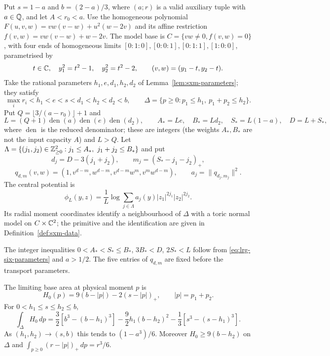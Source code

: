 \begin{definition}\label{def:lrg-six-model}
Put $s=1-a$ and $b=(2-a)/3$, where $(a;r)$ is a valid auxiliary tuple with $a\in\mathbb{Q}$, and let $A<r_0<a$.
Use the homogeneous polynomial $F(u,v,w)=vw(v-w)+u^2(w-2v)$ and its affine restriction
$f(v,w)=vw(v-w)+w-2v$. The model base is $C=\{vw\ne0,f(v,w)=0\}$, with four ends of homogeneous limits
$[0:1:0],[0:0:1],[0:1:1],[1:0:0]$, parametrised by
\[
 t\in\mathbb{C},\quad y_1^2=t^2-1,\quad y_2^2=t^2-2,
 \qquad (v,w)=(y_1-t,y_2-t).
\]
Take the rational parameters $h_1,e,d_1,h_2,d_2$ of Lemma~\ref{lem:sxm-parameters}; they satisfy
\begin{equation}\label{eq:lrg-six-parameters}
 \max_i r_i<h_1<e<s<d_1<h_2<d_2<b,
 \qquad \Delta=\{p\ge0:p_1\le h_1,\ p_1+p_2\le h_2\}.
\end{equation}
Put $Q=\lfloor3/(a-r_0)\rfloor+1$ and
\[
 L=(Q+1)\operatorname{den}(a)\operatorname{den}(e)\operatorname{den}(d_2),\qquad
 A_*=Le,\quad B_*=Ld_2,\quad S_*=L(1-a),\quad D=L+S_*,
\]
where $\operatorname{den}$ is the reduced denominator; these are integers (the weights $A_*,B_*$ are not the
input capacity $A$) and $L>Q$.
Let $\Lambda=\{(j_1,j_2)\in\mathbb{Z}_{\ge0}^2:j_1\le A_*,\ j_1+j_2\le B_*\}$ and put
\[
 d_j=D-3(j_1+j_2),\qquad m_j=(S_*-j_1-j_2)_+,
\]
\[
 q_{d,m}(v,w)=(1,v^{d-m},w^{d-m},v^{d-m}w^m,v^mw^{d-m}),
 \qquad a_j=\|q_{d_j,m_j}\|^2.
\]
The central potential is
\begin{equation}\label{eq:lrg-six-potential}
 \phi_L(y,z)=\frac1L\log\sum_{j\in\Lambda}a_j(y)|z_1|^{2j_1}|z_2|^{2j_2}.
\end{equation}
Its radial moment coordinates identify a neighbourhood of $\Delta$ with a toric normal model on $C\times\mathbb{C}^2$;
the primitive and the identification are given in Definition~\ref{def:sxm-data}.
\end{definition}

The integer inequalities $0<A_*<S_*\le B_*$, $3B_*<D$, $2S_*<L$ follow from \eqref{eq:lrg-six-parameters} and
$a>1/2$. The five entries of $q_{d,m}$ are fixed before the transport parameters.

\begin{lemma}\label{lem:lrg-six-profile}
The limiting base area at physical moment $p$ is
\[
 H_0(p)=9(b-|p|)-2(s-|p|)_+,\qquad |p|=p_1+p_2.
\]
For $0<h_1\le s\le h_2\le b$,
\[
 \int_\Delta H_0\,dp=
 \frac32[b^3-(b-h_1)^3]-\frac92h_1(b-h_2)^2
 -\frac13[s^3-(s-h_1)^3].
\]
As $(h_1,h_2)\to(s,b)$ this tends to $(1-a^3)/6$.
Moreover $H_0\ge9(b-h_2)$ on $\Delta$ and
$\int_{p\ge0}(r-|p|)_+\,dp=r^3/6$.
\end{lemma}

